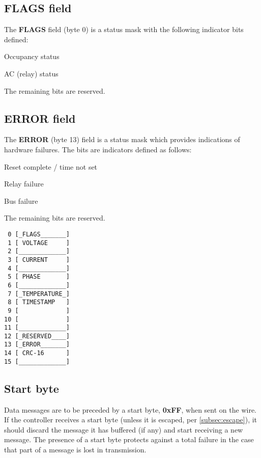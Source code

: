 \documentclass[11pt]{article}
\begin{document}
\vspace{12pt}
\noindent
\begin{minipage}{.5\textwidth}
\subsection{FLAGS field}
The \textbf{FLAGS} field (byte 0) is a status mask with the following indicator bits defined:
\begin{description}
	\itemsep 0pt
	\item[0x01] Occupancy status
	\item[0x02] AC (relay) status 
\end{description}
The remaining bits are reserved.

\subsection{ERROR field}
\label{subsec:errorfield}
The \textbf{ERROR} (byte 13) field is a status mask which provides indications of hardware failures. The bits are indicators defined as follows:
\begin{description}
	\itemsep 0pt
	\item[0x80] Reset complete / time not set
	\item[0x40] Relay failure
	\item[0x20] Bus failure
\end{description}
The remaining bits are reserved. 
\end{minipage}
\hspace{24pt}
\begin{minipage}{.25\textwidth}
\vspace{12pt}
\begin{verbatim}
 0 [_FLAGS_______]
 1 [ VOLTAGE     ]
 2 [_____________]
 3 [ CURRENT     ]
 4 [_____________]
 5 [ PHASE       ]
 6 [_____________]
 7 [_TEMPERATURE_]
 8 [ TIMESTAMP   ]
 9 [             ]
10 [             ]
11 [_____________]
12 [_RESERVED____]
13 [_ERROR_______]
14 [ CRC-16      ]
15 [_____________]
\end{verbatim}
\end{minipage}

\subsection{Start byte}
\label{subsec:startbyte}
Data messages are to be preceded by a start byte, \textbf{0xFF}, when sent on the wire. If the controller receives a start byte (unless it is escaped, per \ref{subsec:escape}), it should discard the message it has buffered (if any) and start receiving a new message. The presence of a start byte protects against a total failure in the case that part of a message is lost in transmission.
\end{document}
